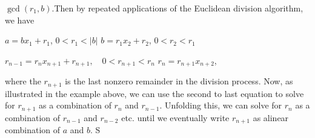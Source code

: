            $\gcd(r_1,b)$.Then by repeated applications of the Euclidean division algorithm, we have

            $a=bx_1+r_1$, $0<r_1<|b|$ $b=r_1x_2+r_2$, $0<r_2<r_1$

            $r_{n-1}=r_nx_{n+1}+r_{n+1},\quad0<r_{n+1}<r_n$
            $r_n=r_{n+1}x_{n+2}$,

            where the $r_{n+1}$ is the last nonzero remainder in the division process. Now, as illustrated in the example above, we can use the second to last equation to solve for $r_{n+1}$ as a combination of $r_n$ and $r_{n-1}$. Unfolding this, we can solve for $r_n$ as a combination of $r_{n-1}$ and $r_{n-2}$ etc. until we eventually write $r_{n+1}$ as alinear
            combination of $a$ and $b$. S